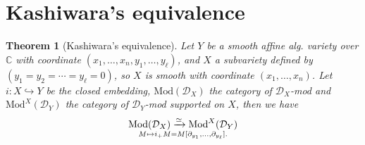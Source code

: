\documentclass[openany]{book}
\newtheorem{theorem}{Theorem}[chapter] %
\theoremstyle{definition} %
\theoremstyle{remark}
\begin{document}
\section{Kashiwara's equivalence}
\begin{theorem}[Kashiwara's equivalence]
    Let $Y$ be a smooth affine alg. variety over $\mathbb{C}$  with coordinate $(x_{1},\dots,x_{n},y_{1},\dots,y_{\ell})$, and $X$ a subvariety defined by $(y_{1}=y_{2}=\cdots=y_{\ell}=0)$, so $X$ is smooth with coordinate $(x_{1},\dots,x_{n})$. Let $i: X \hookrightarrow Y$ be the closed embedding, $\mathrm{Mod}(\mathcal{D}_{X})$ the category of $\mathcal{D}_X$-mod and $\mathrm{Mod}^{X}(\mathcal{D}_{Y})$ the category of $\mathcal{D}_Y$-mod supported on $X$, then we have $$\mathrm{Mod}(\mathcal{D}_{X}) \xrightarrow{\simeq} \mathrm{Mod}^{X}(\mathcal{D}_{Y})\atop M\mapsto i_{+}M=M[\partial_{y_{1}},\dots,\partial_{y_{\ell}}].$$
\end{theorem}
\end{document}
